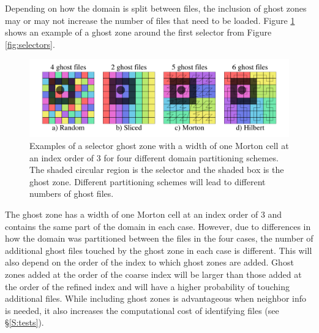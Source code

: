 \documentclass[apjl]{emulateapj}
\begin{document}
Depending on how the domain is split between files, the inclusion of ghost zones may or may not increase the number of files that need to be loaded. Figure \ref{fig:ghosts} shows an example of a ghost zone around the first selector from Figure \ref{fig:selectors}. 
%
\ifinclfig
	\begin{figure}[htbp]
	\begin{center}
	\includegraphics[width=\columnwidth,keepaspectratio]{../images/ghosts.png}
	\caption{Examples of a selector ghost zone with a width of one Morton cell at an index order of 3 for  four different domain partitioning schemes. The shaded circular region is the selector and the shaded box is the ghost zone. Different partitioning schemes will lead to different numbers of ghost files.}
	\label{fig:ghosts}
	\end{center}
	\end{figure}
\fi
%
The ghost zone has a width of one Morton cell at an index order of 3 and contains the same part of the domain in each case. However, due to differences in how the domain was partitioned between the files in the four cases, the number of additional ghost files touched by the ghost zone in each case is different. This will also depend on the order of the index to which ghost zones are added. Ghost zones added at the order of the coarse index will be larger than those added at the order of the refined index and will have a higher probability of touching additional files. While including ghost zones is advantageous when neighbor info is needed, it also increases the computational cost of identifying files (see \S\ref{S:tests}). 

\end{document}
